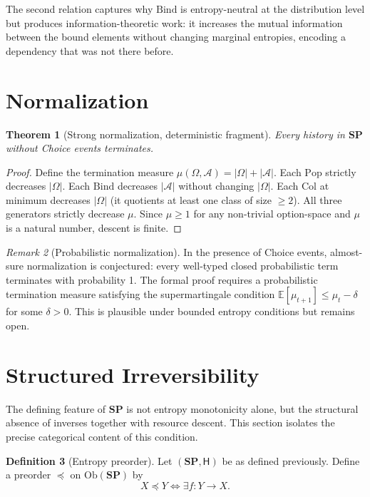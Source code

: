 \documentclass[12pt,a4paper]{article}
\newtheorem{theorem}{Theorem}[section]
\theoremstyle{definition}
\newtheorem{definition}[theorem]{Definition}
\theoremstyle{remark}
\newtheorem{remark}[theorem]{Remark}
\newcommand{\Ent}{\mathsf{H}}
\newcommand{\SP}{\mathbf{SP}}
\newcommand{\Ob}{\mathrm{Ob}}
\newcommand{\Pop}{\mathrm{Pop}}
\newcommand{\Bind}{\mathrm{Bind}}
\newcommand{\Col}{\mathrm{Col}}
\begin{document}
The second relation captures why $\Bind$ is entropy-neutral at the distribution level
but produces information-theoretic work: it increases the mutual information between
the bound elements without changing marginal entropies, encoding a dependency that was
not there before.

\section{Normalization}
\label{sec:norm}

\begin{theorem}[Strong normalization, deterministic fragment]
\label{thm:sn}
Every history in $\SP$ without Choice events terminates.
\end{theorem}

\begin{proof}
Define the termination measure $\mu(\Omega,\mathcal{A})=|\Omega|+|\mathcal{A}|$.
Each $\Pop$ strictly decreases $|\Omega|$. Each $\Bind$ decreases $|\mathcal{A}|$
without changing $|\Omega|$. Each $\Col$ at minimum decreases $|\Omega|$ (it quotients
at least one class of size $\ge 2$). All three generators strictly decrease $\mu$.
Since $\mu\ge 1$ for any non-trivial option-space and $\mu$ is a natural number,
descent is finite.
\end{proof}

\begin{remark}[Probabilistic normalization]
In the presence of Choice events, almost-sure normalization is conjectured: every
well-typed closed probabilistic term terminates with probability 1. The formal proof
requires a probabilistic termination measure satisfying the supermartingale condition
$\mathbb{E}[\mu_{t+1}]\le\mu_t-\delta$ for some $\delta>0$. This is plausible under
bounded entropy conditions but remains open.
\end{remark}

\section{Structured Irreversibility}
\label{sec:structured}

The defining feature of $\SP$ is not entropy monotonicity alone, but the
structural absence of inverses together with resource descent. This
section isolates the precise categorical content of this condition.

\begin{definition}[Entropy preorder]
Let $(\SP,\Ent)$ be as defined previously. Define a preorder
$\preceq$ on $\Ob(\SP)$ by
\[
  X \preceq Y \iff \exists f : Y \to X.
\]
\end{definition}
\end{document}

